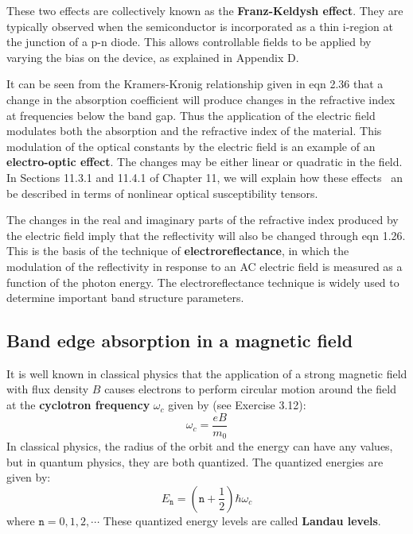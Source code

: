 \documentclass[12pt]{book}
\begin{document}
These two effects are collectively known as the \textbf{Franz-Keldysh effect}. They are typically observed when the semiconductor is incorporated as a thin i-region at the junction of a p-n diode. This allows controllable fields to be applied by varying the bias on the device, as explained in Appendix D.

It can be seen from the Kramers-Kronig relationship given in eqn 2.36 that a change in the absorption coefficient will produce changes in the refractive index at frequencies below the band gap. Thus the application of the electric field modulates both the absorption and the refractive index of the material. This modulation of the optical constants by the electric field is an example of an \textbf{electro-optic effect}. The changes may be either linear or quadratic in the field. In Sections 11.3.1 and 11.4.1 of Chapter 11, we will explain how  these effects ~an be described in terms of nonlinear optical susceptibility tensors.

The changes in the real and imaginary parts of the refractive index produced by the electric field imply that the reflectivity will also be changed through eqn 1.26. This is the basis of the technique of \textbf{electroreflectance}, in which the modulation of the reflectivity in response to an AC electric field is measured as a function of the photon energy. The electroreflectance technique is widely used to determine important band structure parameters.

\subsection{Band edge absorption in a magnetic field}
It is well known in classical physics that the application of a strong magnetic field with flux density $B$ causes electrons to perform circular motion around the field at the \textbf{cyclotron frequency} $\omega_c$ given by (see Exercise 3.12):
\begin{equation}\label{equa:3.27}
  \omega_c=\frac{eB}{m_0}
\end{equation}
In classical physics, the radius of the orbit and the energy can have any values, but in quantum physics, they are both quantized. The quantized energies are given by:
\begin{equation}\label{equa:3.28}
  E_{\texttt{n}}=(\texttt{n}+\frac{1}{2})\hbar\omega_c
\end{equation}
where $\texttt{n} = 0, 1, 2, \cdots$ These quantized energy levels are called \textbf{Landau levels}.
\end{document}
